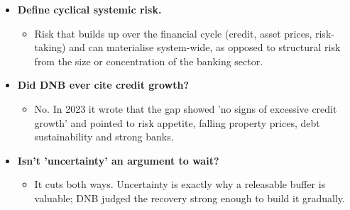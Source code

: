 \documentclass[10pt]{article}
\begin{document}
\begin{tcolorbox}[sbox,width=0.495\linewidth,height=14.6cm,nobeforeafter,box align=top,fit basedim=11pt,colframe=nlred!70,colbacktitle=nlred!8,coltitle=nlred,title=LIKELY CHALLENGES · definitions and logic]
\begin{itemize}
\item[\textcolor{navy}{\textbf{Q}}] \textbf{Define cyclical systemic risk.}
\begin{itemize}
\item Risk that builds up over the financial cycle (credit, asset prices, risk-taking) and can materialise system-wide, as opposed to structural risk from the size or concentration of the banking sector.
\end{itemize}
\item[\textcolor{navy}{\textbf{Q}}] \textbf{Did DNB ever cite credit growth?}
\begin{itemize}
\item No. In 2023 it wrote that the gap showed 'no signs of excessive credit growth' and pointed to risk appetite, falling property prices, debt sustainability and strong banks.
\end{itemize}
\item[\textcolor{navy}{\textbf{Q}}] \textbf{Isn't 'uncertainty' an argument to wait?}
\begin{itemize}
\item It cuts both ways. Uncertainty is exactly why a releasable buffer is valuable; DNB judged the recovery strong enough to build it gradually.
\end{itemize}
\end{itemize}
\end{tcolorbox}
\newpage
\end{document}
